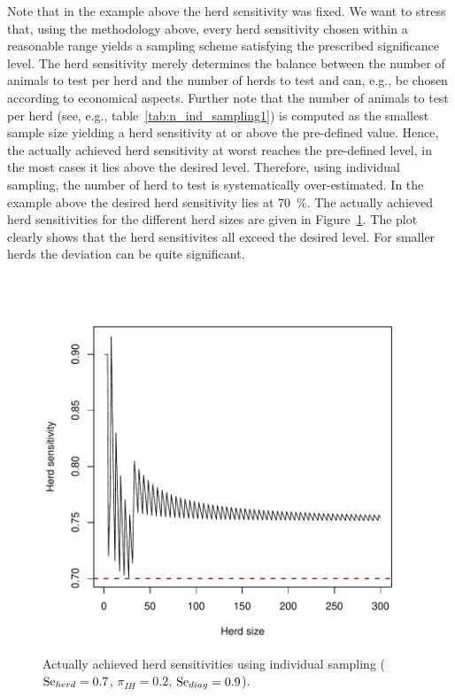 \documentclass[nojss]{jss}
\begin{document}
Note that in the example above the herd sensitivity was fixed. We want to stress that, using the methodology above, every herd sensitivity chosen within a reasonable range yields a sampling scheme satisfying the prescribed significance level. The herd sensitivity merely determines the balance between the number of animals to test per herd and the number of herds to test and can, e.g., be chosen according to economical aspects. Further note that the number of animals to test per herd (see, e.g., table~\ref{tab:n_ind_sampling1}) is computed as the smallest sample size yielding a herd sensitivity at or above the pre-defined value. Hence, the actually achieved herd sensitivity at worst reaches the pre-defined level, in the most cases it lies above the desired level. Therefore, using individual sampling, the number of herd to test is systematically over-estimated. In the example above the desired herd sensitivity lies at 70~\%. The actually achieved herd sensitivities for the different herd sizes are given in Figure~\ref{fig:Herd_sens_ind}. The plot clearly shows that the herd sensitivites all exceed the desired level. For smaller herds the deviation can be quite significant.


\begin{figure}[h!]
\centering
\includegraphics{FFD-intro-003}
\caption{Actually achieved herd sensitivities using individual sampling ($\mbox{Se}_{herd} = 0.7$, $\pi_{IH} = 0.2$, $\mbox{Se}_{diag} = 0.9$).}
\label{fig:Herd_sens_ind}
\end{figure}
\end{document}
